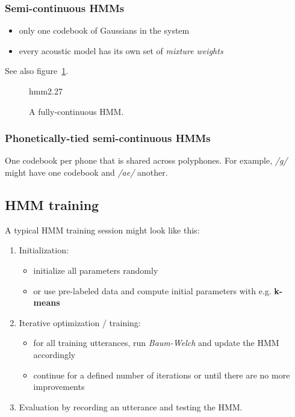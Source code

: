 \subsubsection{Semi-continuous HMMs}
\begin{itemize}
    \item only one codebook of Gaussians in the system
    \item every acoustic model has its own set of \textit{mixture weights}
\end{itemize}
See also figure~\ref{fig:semiContinuousHMMs}.
\begin{figure}[htb]
    \begin{minipage}{\linewidth}
        \vspace{6cm}
        \hfill \scriptsize hmm2.27
    \end{minipage}
    \caption{\label{fig:semiContinuousHMMs} A fully-continuous HMM.}
\end{figure}

\subsubsection{Phonetically-tied semi-continuous HMMs}
One codebook per phone that is shared across polyphones. For example, \textit{/g/} might have one codebook and \textit{/ae/} another.

\subsection{HMM training}

A typical HMM training session might look like this:
\begin{enumerate}
    \item Initialization:
        \begin{itemize}
            \item initialize all parameters randomly
            \item or use pre-labeled data and compute initial parameters with e.g. \textbf{k-means}
        \end{itemize}
    \item Iterative optimization / training:
        \begin{itemize}
            \item for all training utterances, run \textit{Baum-Welch} and update the HMM accordingly
            \item continue for a defined number of iterations or until there are no more improvements
        \end{itemize}
    \item Evaluation by recording an utterance and testing the HMM.
\end{enumerate}


